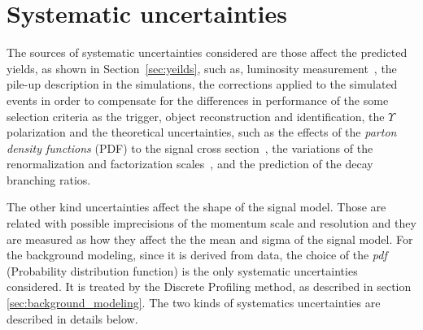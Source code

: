 \section{Systematic uncertainties}

The sources of systematic uncertainties considered are those affect the predicted yields, as shown in Section~\ref{sec:yeilds}, such as, luminosity measurement~\cite{CMS-PAS-LUM-17-001}, the pile-up description in the simulations, the corrections applied to the simulated events in order to compensate for the differences in performance of the some selection criteria as the trigger, object reconstruction and identification, the $\Upsilon$ polarization and the theoretical uncertainties, such as the effects of the \textit{parton density functions} (PDF) to the signal cross section~\cite{NNPDF3,deFlorian:2016spz,Butterworth:2015oua}, the variations of the renormalization and factorization scales~\cite{Martin:2009iq,Lai:2010vv,Alekhin:2011sk,Botje:2011sn,Ball:2011mu}, and the prediction of the decay branching ratios.

The other kind uncertainties affect the shape of the signal model. Those are related with possible imprecisions of the momentum scale and resolution and they are measured as how they affect the the mean and sigma of the signal model. For the background modeling, since it is derived from data, the choice of the \textit{pdf} (Probability distribution function) is the only systematic uncertainties considered. It is treated by the Discrete Profiling method, as described in section \ref{sec:background_modeling}. The two kinds of systematics uncertainties are described in details below.

